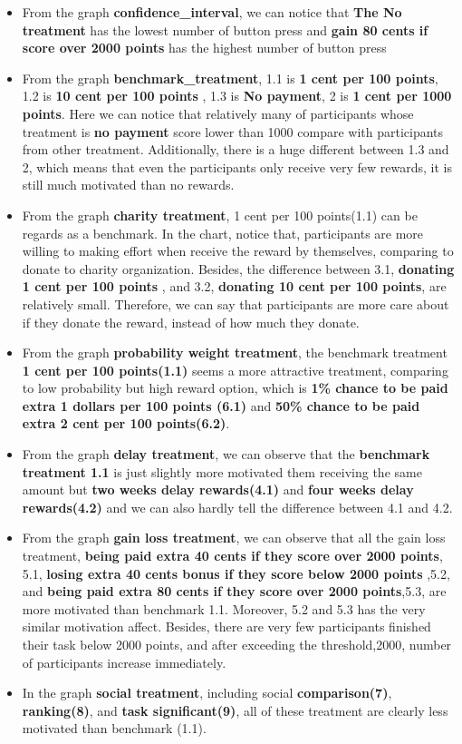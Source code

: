 \documentclass[11pt
]{article}
\begin{document}
\begin{itemize}
\item
  From the graph \textbf{confidence\_interval}, we can notice that
  \textbf{The No treatment} has the lowest number of button press and \textbf{gain
  80 cents if score over 2000 points} has the highest number of button press
\item
  From the graph \textbf{benchmark\_treatment}, 1.1 is \textbf{1 cent
  per 100 points}, 1.2 is \textbf{10 cent per 100 points }, 1.3 is
  \textbf{No payment}, 2 is \textbf{1 cent per 1000 points}. Here we can
  notice that relatively many of participants whose treatment is
  \textbf{no payment} score lower than 1000 compare with participants
  from other treatment. Additionally, there is a huge different between
  1.3 and 2, which means that even the participants only receive very
  few rewards, it is still much motivated than no rewards.
\item
  From the graph \textbf{charity treatment}, 1 cent per 100 points(1.1)
  can be regards as a benchmark. In the chart, notice that, participants
  are more willing to making effort when receive the reward by themselves, comparing
  to donate to charity organization. Besides, the difference between
  3.1, \textbf{donating 1 cent per 100 points} , and 3.2,
  \textbf{donating 10 cent per 100 points}, are relatively small.
  Therefore, we can say that participants are more care about if they
  donate the reward, instead of how much they donate.
\item
  From the graph \textbf{probability weight treatment}, the benchmark
  treatment \textbf{1 cent per 100 points(1.1)} seems a more attractive
  treatment, comparing to low probability but high reward option, which
  is \textbf{1\% chance to be paid extra 1 dollars per 100 points (6.1)}
  and \textbf{50\% chance to be paid extra 2 cent per 100 points(6.2)}.
\item
  From the graph \textbf{delay treatment}, we can observe that the
  \textbf{benchmark treatment 1.1} is just slightly more motivated them
  receiving the same amount but \textbf{two weeks delay rewards(4.1)} and \textbf{four weeks
  delay rewards(4.2)} and we can also hardly tell the difference between
  4.1 and 4.2.
\item
  From the graph \textbf{gain loss treatment}, we can observe that all
  the gain loss treatment, \textbf{being paid extra 40 cents if they
  score over 2000 points}, 5.1, \textbf{losing extra 40 cents bonus if
  they score below 2000 points} ,5.2, and \textbf{being paid extra 80
  cents if they score over 2000 points},5.3, are more motivated than
  benchmark 1.1. Moreover, 5.2 and 5.3 has the very similar motivation
  affect. Besides, there are very few participants finished their task
  below 2000 points, and after exceeding the threshold,2000, number of
  participants increase immediately.
\item
  In the graph \textbf{social treatment}, including social
  \textbf{comparison(7)}, \textbf{ranking(8)}, and \textbf{task significant(9)}, all of these
  treatment are clearly less motivated than benchmark (1.1).
\end{itemize}
\end{document}
